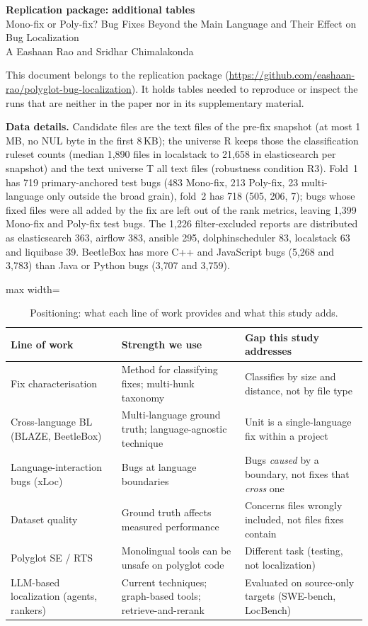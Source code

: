 \documentclass[a4paper,10pt]{article}
\begin{document}
\begin{center}
{\Large\bfseries Replication package: additional tables}\\[4pt]
Mono-fix or Poly-fix? Bug Fixes Beyond the Main Language and Their Effect on Bug Localization\\[2pt]
A Eashaan Rao and Sridhar Chimalakonda
\end{center}

This document belongs to the replication package
(\url{https://github.com/eashaan-rao/polyglot-bug-localization}). It holds
tables needed to reproduce or inspect the runs that are neither in the paper
nor in its supplementary material.

\textbf{Data details.} Candidate files are the text files of the pre-fix
snapshot (at most 1\,MB, no NUL byte in the first 8\,KB); the universe R keeps
those the classification ruleset counts (median 1{,}890 files in localstack to
21{,}658 in elasticsearch per snapshot) and the text universe T all text files
(robustness condition R3). Fold~1 has 719 primary-anchored test bugs (483 Mono-fix, 213
Poly-fix, 23 multi-language only outside the broad grain), fold~2 has 718 (505,
206, 7); bugs whose fixed files were all added by the fix are left out of the
rank metrics, leaving 1{,}399 Mono-fix and Poly-fix test bugs. The 1{,}226
filter-excluded reports are distributed as elasticsearch 363, airflow 383,
ansible 295, dolphinscheduler 83, localstack 63 and liquibase 39. BeetleBox has
more C++ and JavaScript bugs (5{,}268 and 3{,}783) than Java or Python bugs
(3{,}707 and 3{,}759).

\begin{table}[t]
\caption{Positioning: what each line of work provides and what this study adds.}
\label{tab:positioning}
\small
\begin{adjustbox}{max width=\linewidth}\begin{tabular}{p{3.3cm}p{6.2cm}p{6.6cm}}
\toprule
Line of work & Strength we use & Gap this study addresses \\
\midrule
Fix characterisation & Method for classifying fixes; multi-hunk taxonomy & Classifies by size and distance, not by file type \\
Cross-language BL (BLAZE, BeetleBox) & Multi-language ground truth; language-agnostic technique & Unit is a single-language fix within a project \\
Language-interaction bugs (xLoc) & Bugs at language boundaries & Bugs \emph{caused} by a boundary, not fixes that \emph{cross} one \\
Dataset quality & Ground truth affects measured performance & Concerns files wrongly included, not files fixes contain \\
Polyglot SE / RTS & Monolingual tools can be unsafe on polyglot code & Different task (testing, not localization) \\
LLM-based localization (agents, rankers) & Current techniques; graph-based tools; retrieve-and-rerank & Evaluated on source-only targets (SWE-bench, LocBench) \\
\bottomrule
\end{tabular}\end{adjustbox}
\end{table}
\end{document}
